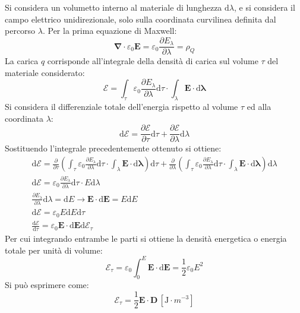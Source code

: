 \documentclass{article}
\newcommand{\vect}[1]{\boldsymbol{\mathbf{#1}}}
\newcommand{\df}{\mathrm{d}}
\newcommand{\SI}[1]{\mathrm{#1}}
\numberwithin{equation}{subsection}
\begin{document}
Si considera un volumetto interno al materiale di lunghezza $\df\lambda$, e si considera il campo elettrico unidirezionale, solo sulla coordinata curvilinea definita dal 
percorso $\lambda$. Per la prima equazione di Maxwell:
\begin{equation*}
    \vect\nabla\cdot\varepsilon_0\vect{E}=\varepsilon_0\displaystyle\frac{\partial E_{\lambda}}{\partial\lambda}=\rho_Q
\end{equation*}
La carica $q$ corrisponde all'integrale della densità di carica sul volume $\tau$ del materiale considerato:
\begin{equation*}
    \mathscr{E}=\displaystyle\int_{\tau}\varepsilon_0\frac{\partial E_{\lambda}}{\partial\lambda}\df\tau\cdot\int_{\lambda}\vect{E}\cdot \df\vect{\lambda}
\end{equation*}
Si considera il differenziale totale dell'energia rispetto al volume $\tau$ ed alla coordinata $\lambda$:
\begin{equation*}
    \df\mathscr{E}=\displaystyle\frac{\partial \mathscr{E}}{\partial \tau}\df\tau+\frac{\partial\mathscr{E}}{\partial \lambda}\df\lambda
\end{equation*}
Sostituendo l'integrale precedentemente ottenuto si ottiene:
\begin{gather*}
    \df\mathscr{E}=\frac{\partial}{\partial \tau}\left(\displaystyle\int_{\tau}\varepsilon_0\frac{\partial E_{\lambda}}{\partial\lambda}\df\tau\cdot\int_{\lambda}\vect{E}\cdot \df\vect{\lambda}\right)\df\tau+\frac{\partial}{\partial \lambda}\left(\displaystyle\int_{\tau}\varepsilon_0\frac{\partial E_{\lambda}}{\partial\lambda}\df\tau\cdot\int_{\lambda}\vect{E}\cdot \df\vect{\lambda}\right)\df\lambda\\
    \df\mathscr{E}=\displaystyle\varepsilon_0\frac{\partial E_{\lambda}}{\partial\lambda}\df\tau\cdot E\df\lambda\\
    \displaystyle\frac{\partial E_{\lambda}}{\partial \lambda}\df\lambda=\df E\to\vect{E}\cdot \df\vect{E}=E\df E\\
    \df\mathscr{E}=\varepsilon_0E\df E\df\tau\\
    \frac{\df\mathscr{E}}{\df\tau}=\varepsilon_0\vect{E}\cdot \df\vect{E}\df\mathscr{E}_{\tau}
\end{gather*}
Per cui integrando entrambe le parti si ottiene la densità energetica o energia totale per unità di volume:
\begin{equation*}
    \mathscr{E}_\tau=\varepsilon_0\displaystyle\int_{0}^E\vect{E}\cdot \df\vect{E}=\frac{1}{2}\varepsilon_0E^2
\end{equation*}
Si può esprimere come:
\begin{equation}
    \mathscr{E}_{\tau}=\displaystyle\frac{1}{2}\vect{E}\cdot\vect{D}\,\left[\SI{J}\cdot{m}^{-3}\right]
\end{equation}
\end{document}

